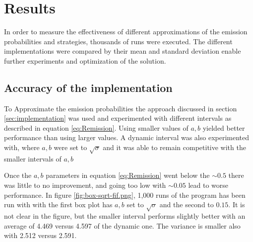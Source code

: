 \documentclass[12pt, a4paper]{article}
\begin{document}


\section{Results}

In order to measure the effectiveness of different approximations of the emission probabilities and strategies, thousands of runs were executed. The different implementations were compared by their mean and standard deviation enable further experiments and optimization of the solution. 

\subsection{Accuracy of the implementation}
To Approximate the emission probabilities the approach discussed in section \ref{sec:implementation} was used and experimented with different intervals as described in equation \ref{eq:Remission}. Using smaller values of $a,b$ yielded better performance than using larger values. A dynamic interval was also experimented with, where $a,b$ were set to $\sqrt{\sigma}$ and it was able to remain competitive with the smaller intervals of $a,b$

Once the $a,b$ parameters in equation \ref{eq:Remission} went below the $\sim0.5$ there was little to no improvement, and going too low with $\sim0.05$ lead to worse performance. In figure \ref{fig:box-sqrt-fif.png}, 1,000 runs of the program has been run with with the first box plot has $a,b$ set to $\sqrt{\sigma}$ and the second to $0.15$. It is not clear in the figure, but the smaller interval performs slightly better with an average of 4.469 versus 4.597 of the dynamic one. The variance is smaller also with 2.512 versus 2.591.%
\end{document}
